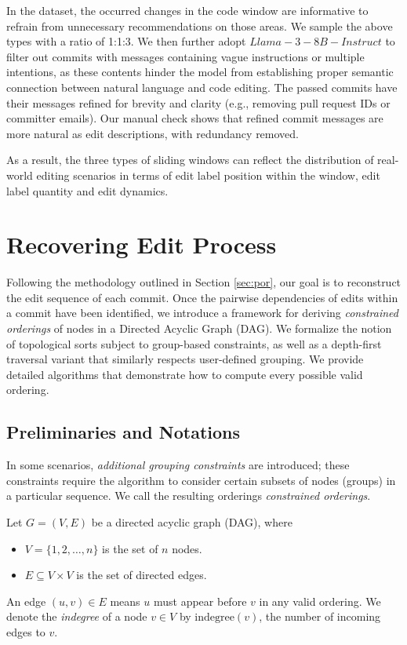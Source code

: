 In the dataset, the occurred changes in the code window are informative to refrain from unnecessary recommendations on those areas. We sample the above types with a ratio of 1:1:3. We then further adopt $Llama-3-8B-Instruct$ to filter out commits with messages containing vague instructions or multiple intentions, as these contents hinder the model from establishing proper semantic connection between natural language and code editing. The passed commits have their messages refined for brevity and clarity (e.g., removing pull request IDs or committer emails). Our manual check shows that refined commit messages are more natural as edit descriptions, with redundancy removed.

As a result, the three types of sliding windows can reflect the distribution of real-world editing scenarios in terms of edit label position within the window, edit label quantity and edit dynamics.

\section{Recovering Edit Process}

Following the methodology outlined in Section \ref{sec:por}, our goal is to reconstruct the edit sequence of each commit. Once the pairwise dependencies of edits within a commit have been identified, we introduce a framework for deriving \emph{constrained orderings} of nodes in a Directed Acyclic Graph (DAG). We formalize the notion of topological sorts subject to group-based constraints, as well as a depth-first traversal variant that similarly respects user-defined grouping. We provide detailed algorithms that demonstrate how to compute every possible valid ordering.

\subsection{Preliminaries and Notations}

In some scenarios, \emph{additional grouping constraints} are introduced; these constraints require the algorithm to consider certain subsets of nodes (groups) in a particular sequence. We call the resulting orderings \emph{constrained orderings}.

Let $G = (V, E)$ be a directed acyclic graph (DAG), where
\begin{itemize}
    \item $V = \{1,2,\ldots,n\}$ is the set of $n$ nodes.
    \item $E \subseteq V \times V$ is the set of directed edges.
\end{itemize}
An edge $(u,v) \in E$ means $u$ must appear before $v$ in any valid ordering.  
We denote the \emph{indegree} of a node $v \in V$ by $\text{indegree}(v)$, the number of incoming edges to $v$.

